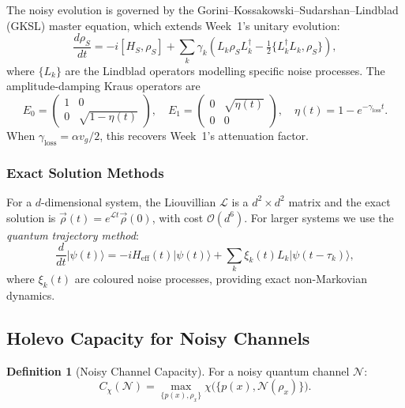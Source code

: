 \documentclass[12pt,a4paper]{article}
\theoremstyle{definition}
\newtheorem{definition}{Definition}[section]
\theoremstyle{plain}
\begin{document}
The noisy evolution is governed by the Gorini--Kossakowski--Sudarshan--Lindblad (GKSL)
master equation, which extends Week~1's unitary evolution:
\begin{equation}
\frac{d\rho_S}{dt}=-i[H_S,\rho_S]+\sum_k\gamma_k\!\left(L_k\rho_S L_k^\dagger-\tfrac{1}{2}\{L_k^\dagger L_k,\rho_S\}\right),
\label{eq:GKSL}
\end{equation}
where $\{L_k\}$ are the Lindblad operators modelling specific noise processes. The amplitude-damping Kraus operators are
\begin{equation}
E_0=\begin{pmatrix}1&0\\0&\sqrt{1-\eta(t)}\end{pmatrix},\quad
E_1=\begin{pmatrix}0&\sqrt{\eta(t)}\\0&0\end{pmatrix},\quad
\eta(t)=1-e^{-\gamma_{\mathrm{loss}}t}.
\end{equation}
When $\gamma_{\mathrm{loss}}=\alpha v_g/2$, this recovers Week~1's attenuation factor.

\subsubsection{Exact Solution Methods}

For a $d$-dimensional system, the Liouvillian $\mathcal{L}$ is a $d^2\times d^2$ matrix and
the exact solution is $\vec\rho(t)=e^{\mathcal{L}t}\vec\rho(0)$, with cost $\mathcal{O}(d^6)$.
For larger systems we use the \emph{quantum trajectory method}:
\begin{equation}
\frac{d}{dt}|\psi(t)\rangle=-iH_{\mathrm{eff}}(t)|\psi(t)\rangle
+\sum_k\xi_k(t)L_k|\psi(t-\tau_k)\rangle,
\end{equation}
where $\xi_k(t)$ are coloured noise processes, providing exact non-Markovian dynamics.

\subsection{Holevo Capacity for Noisy Channels}

\begin{definition}[Noisy Channel Capacity]
For a noisy quantum channel $\mathcal{N}$:
\begin{equation}
C_\chi(\mathcal{N})=\max_{\{p(x),\rho_x\}}\chi\bigl(\{p(x),\mathcal{N}(\rho_x)\}\bigr).
\end{equation}
\end{definition}
\end{document}
